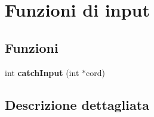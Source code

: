 \hypertarget{group__Input}{}\section{Funzioni di input}
\label{group__Input}
\subsection*{Funzioni}
\begin{DoxyCompactItemize}
\item 
\mbox{\label{group__Input_gaea9923d023794e06e7d3d26f2462b8ad}} 
int {\bfseries catch\+Input} (int $\ast$cord)
\end{DoxyCompactItemize}


\subsection{Descrizione dettagliata}

